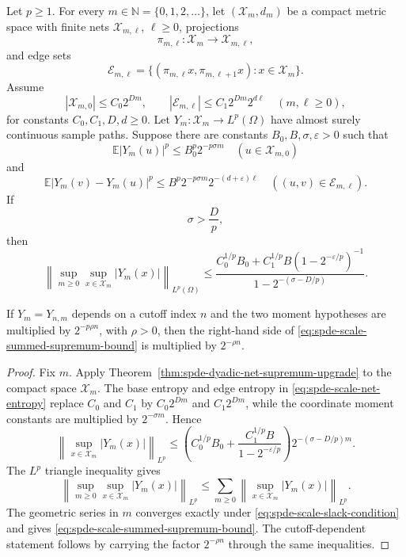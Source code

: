 \begin{corollary}
\label{cor:spde-scale-summed-coordinate-upgrade}
Let \(p\geq1\).  For every \(m\in\mathbb N=\{0,1,2,\ldots\}\), let
\((\mathcal X_m,d_m)\) be a compact metric space with finite nets
\(\mathcal X_{m,\ell}\), \(\ell\geq0\), projections
\[
  \pi_{m,\ell}:\mathcal X_m\to\mathcal X_{m,\ell},
\]
and edge sets
\[
  \mathcal E_{m,\ell}
  =
  \{(\pi_{m,\ell}x,\pi_{m,\ell+1}x):x\in\mathcal X_m\}.
\]
Assume
\begin{equation}
  |\mathcal X_{m,0}|\leq C_0 2^{D m},
  \qquad
  |\mathcal E_{m,\ell}|\leq C_1 2^{D m}2^{d\ell}
  \quad(m,\ell\geq0),
  \label{eq:spde-scale-net-entropy}
\end{equation}
for constants \(C_0,C_1,D,d\geq0\).  Let \(Y_m:\mathcal X_m\to
L^p(\Omega)\) have almost surely continuous sample paths.  Suppose there are
constants \(B_0,B,\sigma,\varepsilon>0\) such that
\[
  \mathbb E|Y_m(u)|^p\leq B_0^p2^{-p\sigma m}
  \quad(u\in\mathcal X_{m,0})
\]
and
\[
  \mathbb E|Y_m(v)-Y_m(u)|^p
  \leq
  B^p2^{-p\sigma m}2^{-(d+\varepsilon)\ell}
  \quad((u,v)\in\mathcal E_{m,\ell}).
\]
If
\begin{equation}
  \sigma>\frac{D}{p},
  \label{eq:spde-scale-slack-condition}
\end{equation}
then
\begin{equation}
  \left\|
    \sup_{m\geq0}\sup_{x\in\mathcal X_m}|Y_m(x)|
  \right\|_{L^p(\Omega)}
  \leq
  \frac{
    C_0^{1/p}B_0+
    C_1^{1/p}B(1-2^{-\varepsilon/p})^{-1}
  }
  {1-2^{-(\sigma-D/p)}} .
  \label{eq:spde-scale-summed-supremum-bound}
\end{equation}

If \(Y_m=Y_{n,m}\) depends on a cutoff index \(n\) and the two moment
hypotheses are multiplied by \(2^{-p\rho n}\), with \(\rho>0\), then the
right-hand side of \eqref{eq:spde-scale-summed-supremum-bound} is multiplied
by \(2^{-\rho n}\).
\end{corollary}

\begin{proof}
Fix \(m\).  Apply
Theorem~\ref{thm:spde-dyadic-net-supremum-upgrade} to the compact space
\(\mathcal X_m\).  The base entropy and edge entropy in
\eqref{eq:spde-scale-net-entropy} replace \(C_0\) and \(C_1\) by
\(C_0 2^{Dm}\) and \(C_1 2^{Dm}\), while the coordinate moment constants are
multiplied by \(2^{-\sigma m}\).  Hence
\[
  \left\|
    \sup_{x\in\mathcal X_m}|Y_m(x)|
  \right\|_{L^p}
  \leq
  \left(
    C_0^{1/p}B_0+
    \frac{C_1^{1/p}B}{1-2^{-\varepsilon/p}}
  \right)
  2^{-(\sigma-D/p)m}.
\]
The \(L^p\) triangle inequality gives
\[
  \left\|
    \sup_{m\geq0}\sup_{x\in\mathcal X_m}|Y_m(x)|
  \right\|_{L^p}
  \leq
  \sum_{m\geq0}
  \left\|
    \sup_{x\in\mathcal X_m}|Y_m(x)|
  \right\|_{L^p}.
\]
The geometric series in \(m\) converges exactly under
\eqref{eq:spde-scale-slack-condition} and gives
\eqref{eq:spde-scale-summed-supremum-bound}.  The cutoff-dependent statement
follows by carrying the factor \(2^{-\rho n}\) through the same inequalities.
\end{proof}

